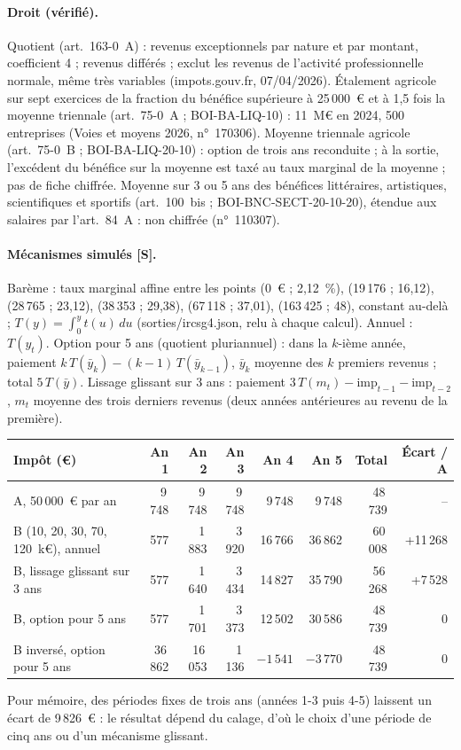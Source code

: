 \paragraph{Droit (vérifié).} Quotient (art.~163-0~A) : revenus exceptionnels par nature et par montant, coefficient 4 ;
revenus différés ; exclut les revenus de l'activité professionnelle normale, même très variables (impots.gouv.fr,
07/04/2026). Étalement agricole sur sept exercices de la fraction du bénéfice supérieure à 25\,000~€ et à 1,5 fois la
moyenne triennale (art.~75-0~A ; BOI-BA-LIQ-10) : 11~M€ en 2024, 500 entreprises (Voies et moyens 2026, n°~170306).
Moyenne triennale agricole (art.~75-0~B ; BOI-BA-LIQ-20-10) : option de trois ans reconduite ; à la sortie, l'excédent
du bénéfice sur la moyenne est taxé au taux marginal de la moyenne ; pas de fiche chiffrée. Moyenne sur 3 ou 5 ans des
bénéfices littéraires, artistiques, scientifiques et sportifs (art.~100~bis ; BOI-BNC-SECT-20-10-20), étendue aux
salaires par l'art.~84~A : non chiffrée (n°~110307).

\paragraph{Mécanismes simulés [S].} Barème : taux marginal affine entre les points (0~€ ; 2,12~\%), (19\,176 ; 16,12),
(28\,765 ; 23,12), (38\,353 ; 29,38), (67\,118 ; 37,01), (163\,425 ; 48), constant au-delà ; $T(y)=\int_0^y t(u)\,du$
(sorties/ircsg4.json, relu à chaque calcul). Annuel : $T(y_t)$. Option pour 5 ans (quotient pluriannuel) : dans la
$k$-ième année, paiement $k\,T(\bar y_k) - (k-1)\,T(\bar y_{k-1})$, $\bar y_k$ moyenne des $k$ premiers revenus ;
total $5\,T(\bar y)$. Lissage glissant sur 3 ans : paiement $3\,T(m_t) - \mathrm{imp}_{t-1} - \mathrm{imp}_{t-2}$,
$m_t$ moyenne des trois derniers revenus (deux années antérieures au revenu de la première).

\begin{center}\small\setlength{\tabcolsep}{4.5pt}\begin{tabular}{@{}lrrrrrrr@{}}\toprule
Impôt (€) & An 1 & An 2 & An 3 & An 4 & An 5 & Total & Écart / A \\\midrule
A, 50\,000~€ par an & 9\,748 & 9\,748 & 9\,748 & 9\,748 & 9\,748 & 48\,739 & -- \\
B (10, 20, 30, 70, 120~k€), annuel & 577 & 1\,883 & 3\,920 & 16\,766 & 36\,862 & 60\,008 & +11\,268 \\
B, lissage glissant sur 3 ans & 577 & 1\,640 & 3\,434 & 14\,827 & 35\,790 & 56\,268 & +7\,528 \\
B, option pour 5 ans & 577 & 1\,701 & 3\,373 & 12\,502 & 30\,586 & 48\,739 & 0 \\
B inversé, option pour 5 ans & 36\,862 & 16\,053 & 1\,136 & $-1\,541$ & $-3\,770$ & 48\,739 & 0 \\\bottomrule
\end{tabular}\end{center}
Pour mémoire, des périodes fixes de trois ans (années 1-3 puis 4-5) laissent un écart de 9\,826~€ : le résultat dépend
du calage, d'où le choix d'une période de cinq ans ou d'un mécanisme glissant.

